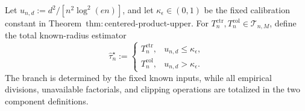 Let \(u_{n,d}:=d^2/[n^2\log^2(en)]\), and let \(\kappa_{\epsilon}\in(0,1)\) be the fixed calibration constant in Theorem~\(\mathrm{thm:centered\text{-}product\text{-}upper}\).  For \(T_n^{\mathrm{ctr}},T_n^{\mathrm{col}}\in\mathcal T_{n,M}\), define the total known-radius estimator
\[
 \widehat\tau_n^{\star}:=
 \begin{cases}
 T_n^{\mathrm{ctr}},&u_{n,d}\le\kappa_{\epsilon},\\
 T_n^{\mathrm{col}},&u_{n,d}>\kappa_{\epsilon}.
 \end{cases}
\]
The branch is determined by the fixed known inputs, while all empirical divisions, unavailable factorials, and clipping operations are totalized in the two component definitions.